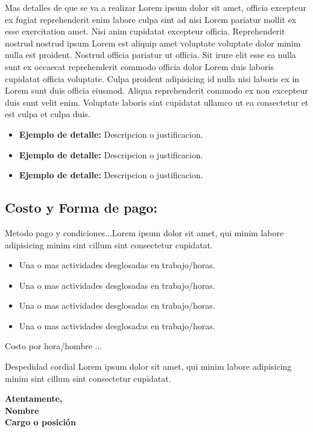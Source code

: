\documentclass[letterpaper,12pt]{dasesu_article}
\begin{document}
Mas detalles de que se va a realizar
Lorem ipsum dolor sit amet, officia excepteur ex fugiat reprehenderit enim labore culpa sint ad nisi Lorem pariatur mollit ex esse exercitation amet. Nisi anim cupidatat excepteur officia. Reprehenderit nostrud nostrud ipsum Lorem est aliquip amet voluptate voluptate dolor minim nulla est proident. Nostrud officia pariatur ut officia. Sit irure elit esse ea nulla sunt ex occaecat reprehenderit commodo officia dolor Lorem duis laboris cupidatat officia voluptate. Culpa proident adipisicing id nulla nisi laboris ex in Lorem sunt duis officia eiusmod. Aliqua reprehenderit commodo ex non excepteur duis sunt velit enim. Voluptate laboris sint cupidatat ullamco ut ea consectetur et est culpa et culpa duis.

\begin{itemize}
   \item \textbf{Ejemplo de detalle:} Descripcion o justificacion.
   \item \textbf{Ejemplo de detalle:} Descripcion o justificacion.
   \item \textbf{Ejemplo de detalle:} Descripcion o justificacion.
\end{itemize}

\subsection{Costo y Forma de pago:}

Metodo pago y condiciones...Lorem ipsum dolor sit amet, qui minim labore adipisicing minim sint cillum sint consectetur cupidatat.

\begin{itemize}
   \item Una o mas actividades desglosadas en trabajo/horas.
   \item Una o mas actividades desglosadas en trabajo/horas.
   \item Una o mas actividades desglosadas en trabajo/horas.
   \item Una o mas actividades desglosadas en trabajo/horas.
\end{itemize}

Costo por hora/hombre ...

Despedidad cordial
Lorem ipsum dolor sit amet, qui minim labore adipisicing minim sint cillum sint consectetur cupidatat.

\vspace{2cm}
\begin{center}
\textbf{
   Atentamente,\\
   \vspace*{1em}
   Nombre\\
   Cargo o posición\\
}
\end{center}
\end{document}
